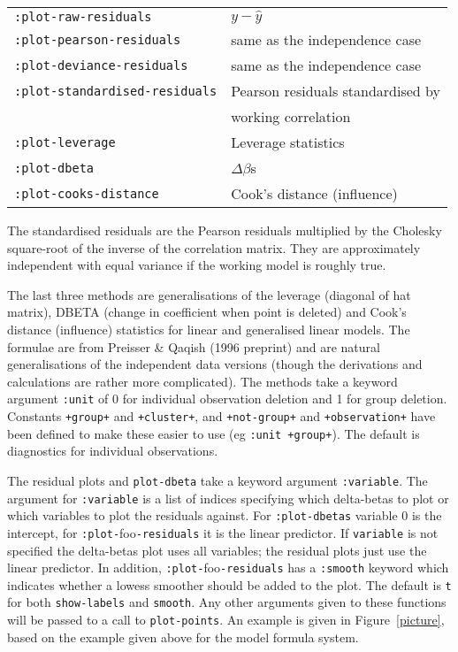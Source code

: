 \documentclass[10pt]{article}
\begin{document}
\begin{tabular}{ll}
\hline
\texttt{:plot-raw-residuals} & $y-\hat y$\\
\texttt{:plot-pearson-residuals} & same as the independence case\\
\texttt{:plot-deviance-residuals} & same as the independence case\\
\texttt{:plot-standardised-residuals} & Pearson residuals standardised by\\
                        & working correlation\\
\texttt{:plot-leverage} & Leverage statistics\\
\texttt{:plot-dbeta} &  $\Delta \beta$s\\
\texttt{:plot-cooks-distance} & Cook's distance (influence)\\
\hline
\end{tabular}

The standardised residuals are the Pearson residuals multiplied by the Cholesky square-root of the inverse of the correlation matrix. They are approximately independent with equal variance if the working model is roughly true. 

The last three methods are generalisations of the leverage (diagonal of hat matrix), DBETA (change in coefficient when point is deleted) and Cook's distance (influence) statistics for linear and generalised linear models.  The formulae are from  Preisser \& Qaqish (1996 preprint) and are natural generalisations of the independent data versions (though the derivations and calculations are rather more complicated).  The methods take a keyword  argument \texttt{:unit} of 0 for individual observation deletion  and 1 for group deletion. Constants \texttt{+group+} and \texttt{+cluster+},  and \texttt{+not-group+} and \texttt{+observation+} have been defined to make these easier to use (eg \texttt{:unit +group+}). The default is diagnostics for individual observations.

The residual plots and \texttt{plot-dbeta} take a keyword argument \texttt{:variable}. The argument for \texttt{:variable} is a list of indices specifying which delta-betas to plot or which variables to plot the residuals against. For \texttt{:plot-dbetas} variable 0 is the intercept, for \texttt{:plot-}foo\texttt{-residuals} it is the linear predictor. If \texttt{variable} is not specified the delta-betas plot uses all variables; the residual plots just use the linear predictor.  In addition, \texttt{:plot-}foo\texttt{-residuals} has a \texttt{:smooth} keyword which indicates whether a lowess smoother should be added to the plot. The default is \texttt{t} for both \texttt{show-labels} and \texttt{smooth}. Any other arguments given to these functions will be passed to a call to \texttt{plot-points}. An example is given in Figure~\ref{picture}, based on the example given above for the model formula system.
\end{document}
